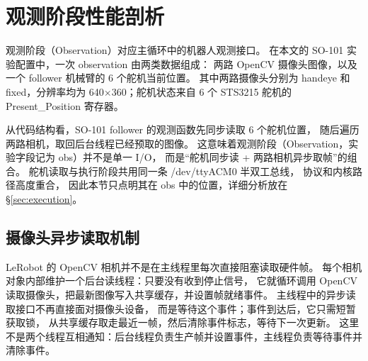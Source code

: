 \section{观测阶段性能剖析}\label{sec:observation}

观测阶段（Observation）对应主循环中的机器人观测接口。
在本文的 SO-101 实验配置中，一次 observation 由两类数据组成：
两路 OpenCV 摄像头图像，以及一个 follower 机械臂的 6 个舵机当前位置。
其中两路摄像头分别为 handeye 和 fixed，分辨率均为
640$\times$360；舵机状态来自 6 个 STS3215 舵机的
Present\_Position 寄存器。

从代码结构看，SO-101 follower 的观测函数先同步读取 6 个舵机位置，
随后遍历两路相机，取回后台线程已经预取的图像。
这意味着观测阶段（Observation，实验字段记为 obs）并不是单一 I/O，
而是“舵机同步读 + 两路相机异步取帧”的组合。
舵机读取与执行阶段共用同一条 /dev/ttyACM0 半双工总线，
协议和内核路径高度重合，
因此本节只点明其在 obs 中的位置，详细分析放在 \S\ref{sec:execution}。

\subsection{摄像头异步读取机制}

LeRobot 的 OpenCV 相机并不是在主线程里每次直接阻塞读取硬件帧。
每个相机对象内部维护一个后台读线程：只要没有收到停止信号，
它就循环调用 OpenCV 读取摄像头，把最新图像写入共享缓存，并设置帧就绪事件。
主线程中的异步读取接口不再直接面对摄像头设备，
而是等待这个事件；事件到达后，它只需短暂获取锁，
从共享缓存取走最近一帧，然后清除事件标志，等待下一次更新。
这里不是两个线程互相通知：后台线程负责生产帧并设置事件，主线程负责等待事件并清除事件。

